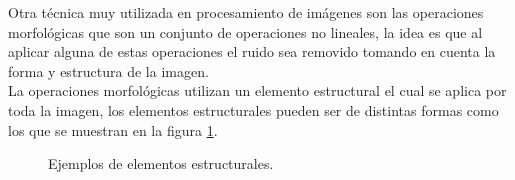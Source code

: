 Otra técnica muy utilizada en procesamiento de imágenes son las operaciones morfológicas que son un conjunto de operaciones no lineales, la idea es que al aplicar alguna de estas operaciones el ruido sea removido tomando en cuenta la forma y estructura de la imagen.\\ 
La operaciones morfológicas \citep{Premaratne2013} utilizan un elemento estructural el cual se aplica por toda la imagen, los elementos estructurales pueden ser de distintas formas como los que se muestran en la figura \ref{fig:EX}.
\begin{figure}[h!]
\centering
{} \qquad
{} \qquad
{} 
\caption{Ejemplos de elementos estructurales.} \label{fig:EX}
\end{figure} 

